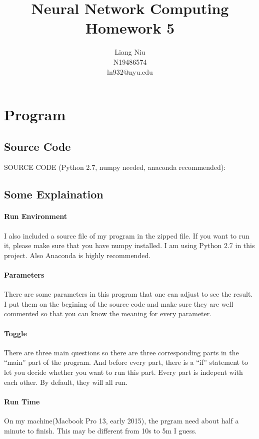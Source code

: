 \documentclass{article}
\title{Neural Network Computing\\Homework 5}
\author{Liang Niu\\N19486574\\ln932@nyu.edu}
\begin{document}
  \maketitle %

  \section{Program}
  \subsection{Source Code}
    SOURCE CODE (Python 2.7, numpy needed, anaconda recommended):
    
  \subsection{Some Explaination}
  \paragraph{Run Environment}
  I also included a source file of my program in the zipped file. If you want to
  run it, please make sure that you have numpy installed. I am using Python 2.7
  in this project. Also Anaconda is highly recommended.
  \paragraph{Parameters}
  There are some parameters in this program that one can adjust to see the
  result. I put them on the begining of the source code and make sure they are
  well commented so that you can know the meaning for every parameter. 
  \paragraph{Toggle}
  There are three main questions so there are three corresponding parts in the
  ``main'' part of the program. And before every part, there is a ``if''
  statement to let you decide whether you want to run this part. Every part is
  indepent with each other. By default, they will all run.
  \paragraph{Run Time}
  On my machine(Macbook Pro 13, early 2015), the prgram need about half a
  minute to finish. This may be different from 10s to 5m I guess.
\end{document}
